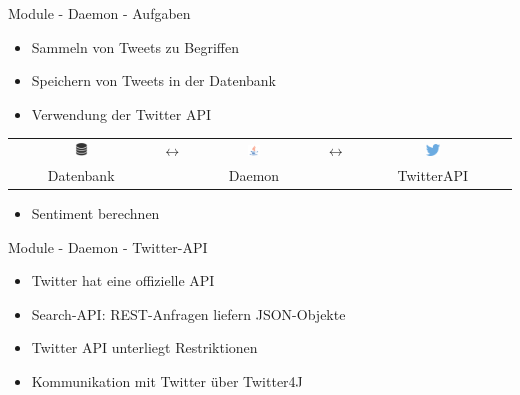 
\begin{frame}{Module - Daemon - Aufgaben}
	\begin{itemize}
		\item Sammeln von Tweets zu Begriffen
		\item Speichern von Tweets in der Datenbank
		\item Verwendung der Twitter API
	\end{itemize}
	
	\pause
	
	\begin{center}
		\begin{tabular}{ccccc}
		\includegraphics[width=0.1\textwidth]{../img/daemon/Database.png} &  $\leftrightarrow$ & \includegraphics[width=0.1\textwidth]{../img/daemon/java.png} & $\leftrightarrow$ &  \includegraphics[width=0.1\textwidth]{../img/daemon/Twitter_logo_blue.pdf} \\
		Datenbank & & Daemon & & TwitterAPI \\
		\end{tabular}

	\end{center}
	
	\pause
	
	\begin{itemize}
		\item Sentiment berechnen
	\end{itemize}
	
\end{frame}

\begin{frame}{Module - Daemon - Twitter-API}
	\begin{itemize}
		\item Twitter hat eine offizielle API
		\item Search-API: REST-Anfragen liefern JSON-Objekte
		\item Twitter API unterliegt Restriktionen %
		\item Kommunikation mit Twitter über Twitter4J
	\end{itemize}
\end{frame}

